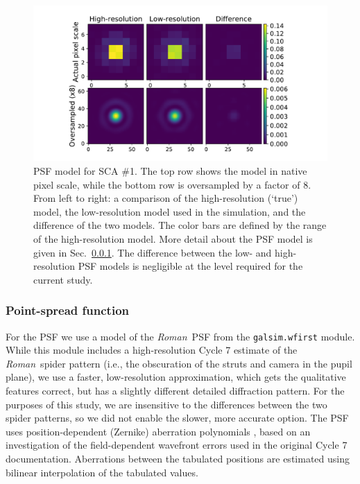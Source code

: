\documentclass[usenatbib]{mnras}
\newcommand{\wfirst}{{\slshape Roman}}
\begin{document}
\begin{figure}
\begin{center}
\includegraphics[width=\columnwidth]{figures/psf.pdf}
\end{center}
\caption[]{
PSF model for SCA \#1. The top row shows the model in native pixel scale, while the bottom row is oversampled by a factor of 8. From left to right: a comparison of the high-resolution (`true') model, the low-resolution model used in the simulation, and the difference of the two models. The color bars are defined by the range of the high-resolution model. More detail about the PSF model is given in Sec.~\ref{psf}. The difference between the low- and high-resolution PSF models is negligible at the level required for the current study.
\label{fig:psf}}
\end{figure}

\subsubsection{Point-spread function}\label{psf}

For the PSF we use a model of the \wfirst\ PSF from the \texttt{galsim.wfirst} module.
While this module includes a high-resolution Cycle 7 estimate of the \wfirst\ spider pattern (i.e., the obscuration of the struts and camera in the pupil plane), we use a faster, low-resolution approximation, which gets the qualitative features correct, but has a slightly different detailed diffraction pattern.  
For the purposes of this study, we are insensitive to the differences between the two spider patterns, so we did not enable the slower, more accurate option.
The PSF uses position-dependent (Zernike) aberration polynomials \citep{noll1976}, based on an investigation of the field-dependent wavefront errors used in the original Cycle 7 documentation.
Aberrations between the tabulated positions are estimated using bilinear interpolation of the tabulated values.
\end{document}
